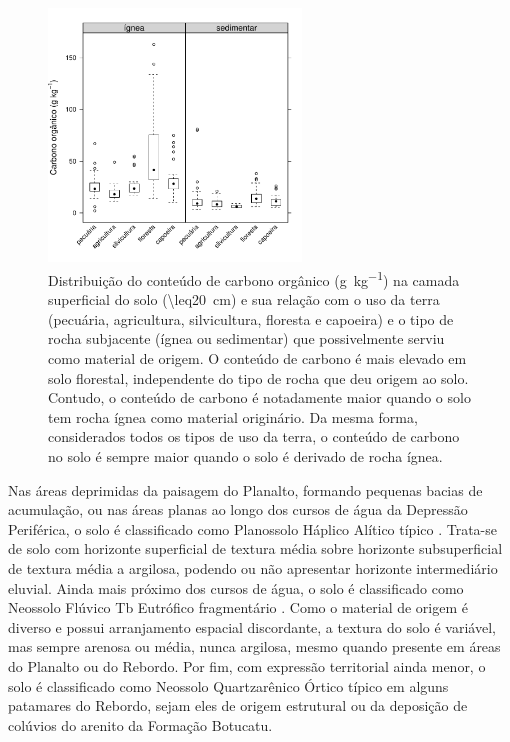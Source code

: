 \begin{figure}[!ht]
\centering
\includegraphics[width=0.60\textwidth]{fig/chap03-orca-land-parent}
\caption[Carbono orgânico no solo e sua relação com o uso da terra e o material de origem do 
solo.]{Distribuição do conteúdo de carbono orgânico (\si{\gram\per\kilo\gram}) na camada superficial do solo 
(\SI{\leq20}{\cm}) e sua relação com o uso da terra (pecuária, agricultura, silvicultura, floresta e capoeira) 
e o tipo de rocha subjacente (ígnea ou sedimentar) que possivelmente serviu como material de origem. O 
conteúdo de carbono é mais elevado em solo florestal, independente do tipo de rocha que deu origem ao solo. 
Contudo, o conteúdo de carbono é notadamente maior quando o solo tem rocha ígnea como material originário. Da 
mesma forma, considerados todos os tipos de uso da terra, o conteúdo de carbono no solo é sempre maior quando 
o solo é derivado de rocha ígnea.}
\label{fig:chap03-orca-land-parent}
\end{figure}

Nas áreas deprimidas da paisagem do Planalto, formando pequenas bacias de acumulação, ou nas áreas planas ao 
longo dos cursos de água da Depressão Periférica, o solo é classificado como Planossolo Háplico Alítico típico 
\cite{Miguel2010}. Trata-se de solo com horizonte superficial de textura média sobre horizonte subsuperficial 
de textura média a argilosa, podendo ou não apresentar horizonte intermediário eluvial. Ainda mais próximo dos 
cursos de água, o solo é classificado como Neossolo Flúvico Tb Eutrófico fragmentário \cite{Miguel2010}. Como 
o material de origem é diverso e possui arranjamento espacial discordante, a textura do solo é variável, mas 
sempre arenosa ou média, nunca argilosa, mesmo quando presente em áreas do Planalto ou do Rebordo. Por fim, 
com expressão territorial ainda menor, o solo é classificado como Neossolo Quartzarênico Órtico típico em 
alguns patamares do Rebordo, sejam eles de origem estrutural ou da deposição de colúvios do arenito da 
Formação Botucatu.

